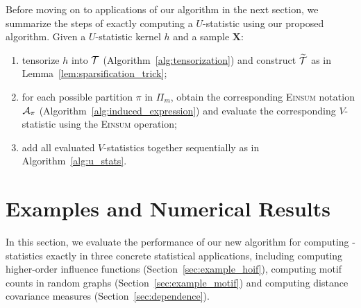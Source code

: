 \documentclass[letterpaper,11pt]{article}
\def\tilde{\widetilde}
\def\Einsum{\textsc{Einsum}}
\newcommand{\libref}[2]{\href{#2}{\texttt{#1}}}
\newcommand{\graphset}{\mathcal{G}}
\newcommand{\graphform}[1]{G_{#1}}
\def\package{\libref{u-stats}{https://github.com/zrq1706/U-Statistics-Python}}
\newcommand{\opteinsum}{\libref{opt-einsum}{https://dgasmith.github.io/opt_einsum/}}
\begin{document}
\begin{bibunit}[plainnat]
Before moving on to applications of our algorithm in the next section, we summarize the steps of exactly computing a $U$-statistic using our proposed algorithm. Given a $U$-statistic kernel $h$ and a sample $\bm{X}$:
\begin{enumerate}[label = (\arabic*)]
\item tensorize $h$ into ${\mathcal{T}}$ (Algorithm~\ref{alg:tensorization}) and construct $\tilde{\calT}$ as in Lemma~\ref{lem:sparsification_trick};

\item for each possible partition $\pi$ in $\Pi_{m}$, obtain the corresponding \Einsum{} notation ${\mathcal{A}}_{\pi}$ (Algorithm~\ref{alg:induced_expression}) and evaluate the corresponding $V$-statistic using the \Einsum{} operation;

\item add all evaluated $V$-statistics together sequentially as in Algorithm~\ref{alg:u_stats}.
\end{enumerate}



\section{Examples and Numerical Results}  
\label{sec:examples}

In this section, we evaluate the performance of our new algorithm for computing -statistics exactly in three concrete statistical applications, including computing higher-order influence functions (Section~\ref{sec:example_hoif}), computing motif counts in random graphs (Section~\ref{sec:example_motif}) and computing distance covariance measures (Section~\ref{sec:dependence}). %


\end{bibunit}
\end{document}
